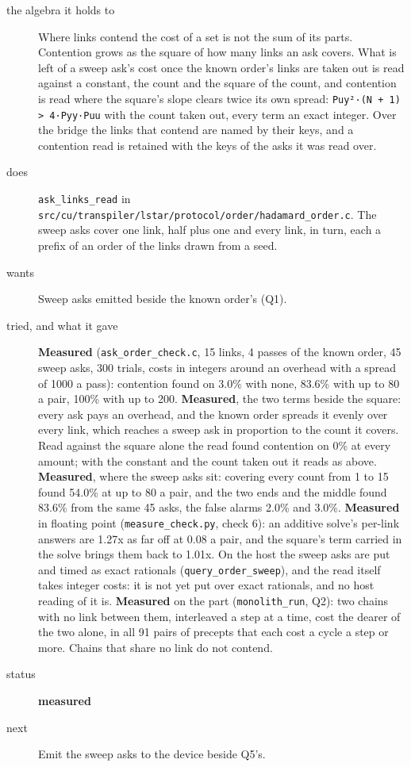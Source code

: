 \begin{description}
\item[{the algebra it holds to}] Where links contend the cost of a set is not the sum of its parts. Contention grows as the square of how many links an ask covers. What is left of a sweep ask's cost once the known order's links are taken out is read against a constant, the count and the square of the count, and contention is read where the square's slope clears twice its own spread: \texttt{Puy²·(N + 1) > 4·Pyy·Puu} with the count taken out, every term an exact integer. Over the bridge the links that contend are named by their keys, and a contention read is retained with the keys of the asks it was read over.
\item[{does}] \texttt{ask\_\allowbreak{}links\_\allowbreak{}read} in \texttt{src/\allowbreak{}cu/\allowbreak{}transpiler/\allowbreak{}lstar/\allowbreak{}protocol/\allowbreak{}order/\allowbreak{}hadamard\_\allowbreak{}order.\allowbreak{}c}. The sweep asks cover one link, half plus one and every link, in turn, each a prefix of an order of the links drawn from a seed.
\item[{wants}] Sweep asks emitted beside the known order's (Q1).
\item[{tried, and what it gave}] \textbf{Measured} (\texttt{ask\_\allowbreak{}order\_\allowbreak{}check.\allowbreak{}c}, 15 links, 4 passes of the known order, 45 sweep asks, 300 trials, costs in integers around an overhead with a spread of 1000 a pass): contention found on 3.0\% with none, 83.6\% with up to 80 a pair, 100\% with up to 200. \textbf{Measured}, the two terms beside the square: every ask pays an overhead, and the known order spreads it evenly over every link, which reaches a sweep ask in proportion to the count it covers. Read against the square alone the read found contention on 0\% at every amount; with the constant and the count taken out it reads as above. \textbf{Measured}, where the sweep asks sit: covering every count from 1 to 15 found 54.0\% at up to 80 a pair, and the two ends and the middle found 83.6\% from the same 45 asks, the false alarms 2.0\% and 3.0\%. \textbf{Measured} in floating point (\texttt{measure\_\allowbreak{}check.\allowbreak{}py}, check 6): an additive solve's per-link answers are 1.27x as far off at 0.08 a pair, and the square's term carried in the solve brings them back to 1.01x. On the host the sweep asks are put and timed as exact rationals (\texttt{query\_\allowbreak{}order\_\allowbreak{}sweep}), and the read itself takes integer costs: it is not yet put over exact rationals, and no host reading of it is. \textbf{Measured} on the part (\texttt{monolith\_\allowbreak{}run}, Q2): two chains with no link between them, interleaved a step at a time, cost the dearer of the two alone, in all 91 pairs of precepts that each cost a cycle a step or more. Chains that share no link do not contend.
\item[{status}] \textbf{measured}
\item[{next}] Emit the sweep asks to the device beside Q5's.
\end{description}

